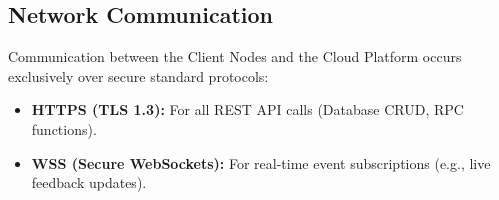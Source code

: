 \subsection{Network Communication}
Communication between the Client Nodes and the Cloud Platform occurs exclusively over secure standard protocols:

\begin{itemize}
    \item \textbf{HTTPS (TLS 1.3):} For all REST API calls (Database CRUD, RPC functions).
    \item \textbf{WSS (Secure WebSockets):} For real-time event subscriptions (e.g., live feedback updates).
\end{itemize}

